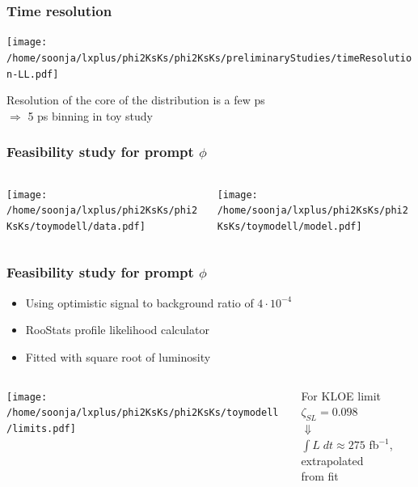 \documentclass{beamer}
\begin{document}
\begin{frame}
\frametitle{Time resolution}
\vspace*{-4mm}
\begin{center}
\texttt{[image: /home/soonja/lxplus/phi2KsKs/phi2KsKs/preliminaryStudies/timeResolution-LL.pdf]}
\end{center}
\vspace*{-4mm}
Resolution of the core of the distribution is a few ps\\
$\Rightarrow$ 5 ps binning in toy study
\end{frame}


\begin{frame}[fragile]
\frametitle{Feasibility study for prompt $\phi$}

\begin{columns}
\begin{column}{.5\textwidth}
\texttt{[image: /home/soonja/lxplus/phi2KsKs/phi2KsKs/toymodell/data.pdf]}
\end{column}

\begin{column}{.5\textwidth}
\texttt{[image: /home/soonja/lxplus/phi2KsKs/phi2KsKs/toymodell/model.pdf]}
\end{column}
\end{columns}

\end{frame}

\begin{frame}
\frametitle{Feasibility study for prompt $\phi$}
\begin{itemize}
\item Using optimistic signal to background ratio of $4\cdot 10^{-4}$
\item RooStats profile likelihood calculator
\item Fitted with square root of luminosity
\end{itemize}

\begin{columns}
\begin{column}{.7\columnwidth}
\vspace*{-.3cm}
\begin{center}
\texttt{[image: /home/soonja/lxplus/phi2KsKs/phi2KsKs/toymodell/limits.pdf]}

\end{center}
\end{column}
\begin{column}{.29\columnwidth}\centering
For KLOE limit $\zeta_{SL} = 0.098$\\
$\Downarrow$\\
$\int L \;dt \approx 275$ fb$^{-1}$,
extrapolated\\ from fit
\end{column}
\end{columns}
\end{frame}
\end{document}
